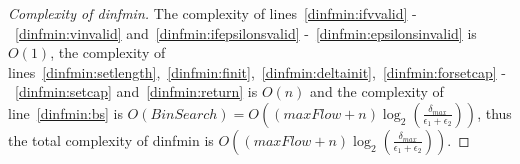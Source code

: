 \begin{proof}[Complexity of dinfmin]
   The complexity of lines~\ref{dinfmin:ifvvalid} -~\ref{dinfmin:vinvalid} and~\ref{dinfmin:ifepsilonsvalid}
   -~\ref{dinfmin:epsilonsinvalid} is $O\left(1\right)$, the complexity of
   lines~\ref{dinfmin:setlength},~\ref{dinfmin:finit},~\ref{dinfmin:deltainit},~\ref{dinfmin:forsetcap}
   -~\ref{dinfmin:setcap} and~\ref{dinfmin:return} is $O\left(n\right)$ and the complexity of line~\ref{dinfmin:bs} is
   $O\left(BinSearch\right) = O\left(\left(maxFlow + n\right) \log_2\left(\frac{\delta_{max}}{\epsilon_1 +
   \epsilon_2}\right)\right)$, thus the total complexity of dinfmin is $O\left(\left(maxFlow +
   n\right)\log_2\left(\frac{\delta_{max}}{\epsilon_1 + \epsilon_2}\right)\right)$.
\end{proof}
